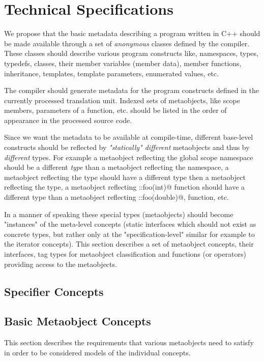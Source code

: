 \section{Technical Specifications}

We propose that the basic metadata describing a program written
in C++ should be made available through a set of {\em anonymous} classes
defined by the compiler. These classes should describe various program
constructs like, namespaces, types, typedefs, classes, their member variables
(member data), member functions, inheritance, templates, template parameters,
enumerated values, etc.

The compiler should generate metadata for the program constructs defined
in the currently processed translation unit. Indexed sets of metaobjects,
like scope members, parameters of a function, etc. should be listed
in the order of appearance in the processed source code.

Since we want the metadata to be available at compile-time,
different base-level constructs should be reflected by
{\em "statically" different} metaobjects and thus by {\em different} types.
For example a metaobject reflecting the global scope namespace should
be a different {\em type} than a metaobject reflecting the \verb@std@
namespace, a metaobject reflecting the \verb@int@ type should
have a different type then a metaobject reflecting the \verb@double@
type, a metaobject reflecting \verb@::foo(int)@ function should
have a different type than a metaobject reflecting \verb@::foo(double)@,
function, etc.

In a manner of speaking these special types (metaobjects) should become
"instances" of the meta-level concepts (static interfaces which
should not exist as concrete types, but rather only at the
"specification-level" similar for example to the iterator concepts).
This section describes a set of metaobject concepts,
their interfaces, tag types for metaobject classification and
functions (or operators) providing access to the metaobjects.

\subsection{Specifier Concepts}

\subsection{Basic Metaobject Concepts}

This section describes the requirements that various metaobjects
need to satisfy in order to be considered models of the individual
concepts.

